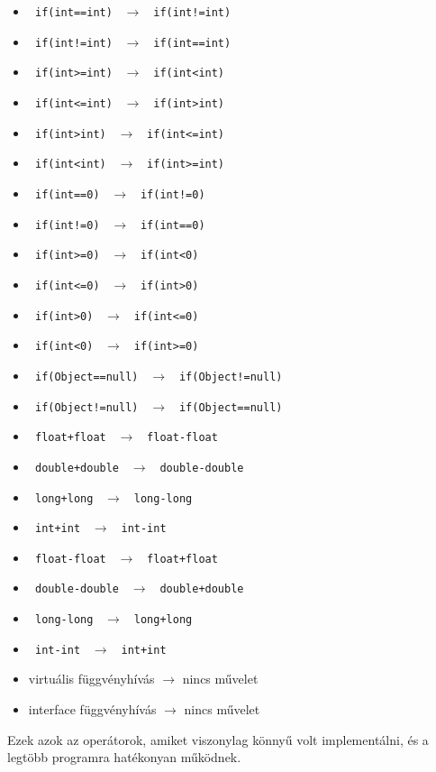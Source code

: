 \begin{itemize}
  \item \lstinline{ if(int==int) } $ \rightarrow $ \lstinline{ if(int!=int) }
  \item \lstinline{ if(int!=int) } $ \rightarrow $ \lstinline{ if(int==int) }
  \item \lstinline{ if(int>=int) } $ \rightarrow $ \lstinline{ if(int<int) }
  \item \lstinline{ if(int<=int) } $ \rightarrow $ \lstinline{ if(int>int) }
  \item \lstinline{ if(int>int) } $ \rightarrow $ \lstinline{ if(int<=int) }
  \item \lstinline{ if(int<int) } $ \rightarrow $ \lstinline{ if(int>=int) }
  \item \lstinline{ if(int==0) } $ \rightarrow $ \lstinline{ if(int!=0) }
  \item \lstinline{ if(int!=0) } $ \rightarrow $ \lstinline{ if(int==0) }
  \item \lstinline{ if(int>=0) } $ \rightarrow $ \lstinline{ if(int<0) }
  \item \lstinline{ if(int<=0) } $ \rightarrow $ \lstinline{ if(int>0) }
  \item \lstinline{ if(int>0) } $ \rightarrow $ \lstinline{ if(int<=0) }
  \item \lstinline{ if(int<0) } $ \rightarrow $ \lstinline{ if(int>=0) }
    \item \lstinline{ if(Object==null) } $ \rightarrow $ \lstinline{ if(Object!=null) }
    \item \lstinline{ if(Object!=null) } $ \rightarrow $ \lstinline{ if(Object==null) }
        
  \item \lstinline{ float+float } $ \rightarrow $ \lstinline{ float-float }
  \item \lstinline{ double+double } $ \rightarrow $ \lstinline{ double-double }
  \item \lstinline{ long+long } $ \rightarrow $ \lstinline{ long-long }
  \item \lstinline{ int+int } $ \rightarrow $ \lstinline{ int-int }
  \item \lstinline{ float-float } $ \rightarrow $ \lstinline{ float+float }
  \item \lstinline{ double-double } $ \rightarrow $ \lstinline{ double+double }
  \item \lstinline{ long-long } $ \rightarrow $ \lstinline{ long+long }
  \item \lstinline{ int-int } $ \rightarrow $ \lstinline{ int+int }
  
    \item virtuális függvényhívás $ \rightarrow $ nincs művelet
    \item interface függvényhívás $ \rightarrow $ nincs művelet
        
\end{itemize}
Ezek azok az operátorok, amiket viszonylag könnyű volt implementálni, és a legtöbb programra hatékonyan működnek. 
